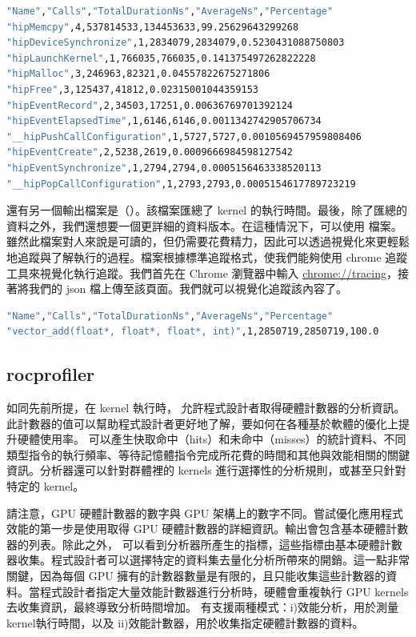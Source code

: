 \begin{lstlisting}[language=bash, caption={\term{results.hip\_stats.csv} 在應用程式追蹤模式下的輸出結果}, label={results.hip_stats.csv output}]
"Name","Calls","TotalDurationNs","AverageNs","Percentage"
"hipMemcpy",4,537814533,134453633,99.25629643299268
"hipDeviceSynchronize",1,2834079,2834079,0.5230431088750803
"hipLaunchKernel",1,766035,766035,0.141375497262822228
"hipMalloc",3,246963,82321,0.04557822675271806
"hipFree",3,125437,41812,0.02315001044359153
"hipEventRecord",2,34503,17251,0.00636769701392124
"hipEventElapsedTime",1,6146,6146,0.0011342742905706734
"__hipPushCallConfiguration",1,5727,5727,0.0010569457959808406
"hipEventCreate",2,5238,2619,0.0009666984598127542
"hipEventSynchronize",1,2794,2794,0.0005156463338520113
"__hipPopCallConfiguration",1,2793,2793,0.0005154617789723219
\end{lstlisting}

還有另一個輸出檔案是（）。該檔案匯總了 kernel 的執行時間。最後，除了匯總的資料之外，我們還想要一個更詳細的資料版本。在這種情況下，可以使用  檔案。雖然此檔案對人來說是可讀的，但仍需要花費精力，因此可以透過視覺化來更輕鬆地追蹤與了解執行的過程。檔案根據標準追蹤格式，使我們能夠使用 chrome 追蹤工具來視覺化執行追蹤。我們首先在 Chrome 瀏覽器中輸入 \url{chrome://tracing}，接著將我們的 json 檔上傳至該頁面。我們就可以視覺化追蹤該內容了。

\begin{lstlisting}[language=bash, caption={\term{results.stats.csv} 在應用程式追蹤模式下的輸出結果}, label={lst:results.stats.csv output}]
"Name","Calls","TotalDurationNs","AverageNs","Percentage"
"vector_add(float*, float*, float*, int)",1,2850719,2850719,100.0
\end{lstlisting}

\subsection{rocprofiler}

如同先前所提，在 kernel 執行時， 允許程式設計者取得硬體計數器的分析資訊。此計數器的值可以幫助程式設計者更好地了解，要如何在各種基於軟體的優化上提升硬體使用率。 可以產生快取命中（hits）和未命中（misses）的統計資料、不同類型指令的執行頻率、等待記憶體指令完成所花費的時間和其他與效能相關的關鍵資訊。分析器還可以針對群體裡的 kernels 進行選擇性的分析規則，或甚至只針對特定的 kernel。

請注意，GPU 硬體計數器的數字與 GPU 架構上的數字不同。嘗試優化應用程式效能的第一步是使用取得 GPU 硬體計數器的詳細資訊。輸出會包含基本硬體計數器的列表。除此之外， 可以看到分析器所產生的指標，這些指標由基本硬體計數器收集。程式設計者可以選擇特定的資料集去量化分析所帶來的開銷。這一點非常關鍵，因為每個 GPU 擁有的計數器數量是有限的，且只能收集這些計數器的資料。當程式設計者指定大量效能計數器進行分析時，硬體會重複執行 GPU kernels 去收集資訊，最終導致分析時間增加。 有支援兩種模式：i)效能分析，用於測量kernel執行時間，以及 ii)效能計數器，用於收集指定硬體計數器的資料。

